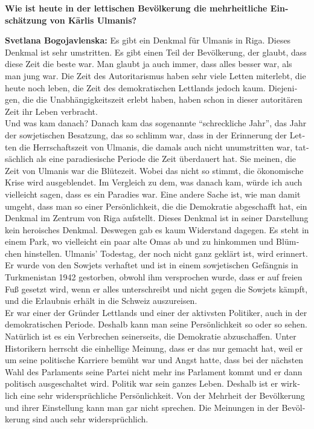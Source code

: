 \begin{otherlanguage}{ngerman}
\textbf{Wie ist heute in der lettischen Bevölkerung die mehrheitliche Einschätzung von Kārlis Ulmanis?}

\textbf{Svetlana Bogojavlenska:} Es gibt ein Denkmal für Ulmanis in Riga. Dieses Denkmal ist sehr umstritten. Es gibt einen Teil der Bevölkerung, der glaubt, dass diese Zeit die beste war. Man glaubt ja auch immer, dass alles besser war, als man jung war. Die Zeit des Autoritarismus haben sehr viele Letten miterlebt, die heute noch leben, die Zeit des demokratischen Lettlands jedoch kaum. Diejenigen, die die Unabhängigkeitszeit erlebt haben, haben schon in dieser autoritären Zeit ihr Leben verbracht.\\ 
Und was kam danach? Danach kam das sogenannte "`schreckliche Jahr"', das Jahr der sowjetischen Besatzung, das so schlimm war, dass in der Erinnerung der Letten die Herrschaftszeit von Ulmanis, die damals auch nicht unumstritten war, tatsächlich als eine paradiesische Periode die Zeit überdauert hat. Sie meinen, die Zeit von Ulmanis war die Blütezeit. Wobei das nicht so stimmt, die ökonomische Krise wird ausgeblendet. Im Vergleich zu dem, was danach kam, würde ich auch vielleicht sagen, dass es ein Paradies war. Eine andere Sache ist, wie man damit umgeht, dass man so einer Persönlichkeit, die die Demokratie abgeschafft hat, ein Denkmal im Zentrum von Riga aufstellt. Dieses Denkmal ist in seiner Darstellung kein heroisches Denkmal. Deswegen gab es kaum Widerstand dagegen. Es steht in einem Park, wo vielleicht ein paar alte Omas ab und zu hinkommen und Blümchen hinstellen. Ulmanis' Todestag, der noch nicht ganz geklärt ist, wird erinnert. Er wurde von den Sowjets verhaftet und ist in einem sowjetischen Gefängnis in Turkmenistan 1942 gestorben, obwohl ihm versprochen wurde, dass er auf freien Fuß gesetzt wird, wenn er alles unterschreibt und nicht gegen die Sowjets kämpft, und die Erlaubnis erhält in die Schweiz auszureisen.\\ 
Er war einer der Gründer Lettlands und einer der aktivsten Politiker, auch in der demokratischen Periode. Deshalb kann man seine Persönlichkeit so oder so sehen. Natürlich ist es ein Verbrechen seinerseits, die Demokratie abzuschaffen. Unter Historikern herrscht die einhellige Meinung, dass er das nur gemacht hat, weil er um seine politische Karriere bemüht war und Angst hatte, dass bei der nächsten Wahl des Parlaments seine Partei nicht mehr ins Parlament kommt und er dann politisch ausgeschaltet wird. Politik war sein ganzes Leben. Deshalb ist er wirklich eine sehr widersprüchliche Persönlichkeit. Von der Mehrheit der Bevölkerung und ihrer Einstellung kann man gar nicht sprechen. Die Meinungen in der Bevölkerung sind auch sehr widersprüchlich.


\end{otherlanguage}
